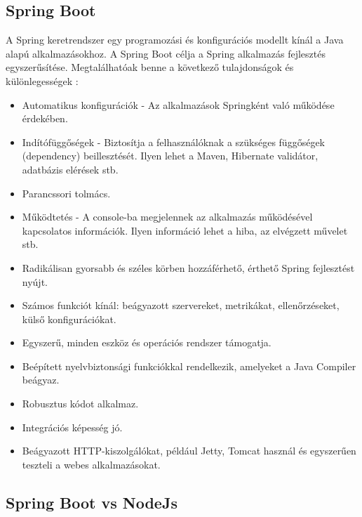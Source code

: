 \subsection{Spring Boot}
A Spring keretrendszer \cite{spring} egy programozási és konfigurációs modellt kínál a Java alapú alkalmazásokhoz. A Spring Boot \cite{jovanovic2017java} célja a Spring alkalmazás fejlesztés egyszerűsítése. Megtalálhatóak benne a következő tulajdonságok és különlegességek \cite{nodejsspring}:
\begin{itemize}
	\item Automatikus konfigurációk - Az alkalmazások Springként való működése érdekében.
	\item Indítófüggőségek - Biztosítja a felhasználóknak a szükséges függőségek (dependency) beillesztését. Ilyen lehet a Maven, Hibernate validátor, adatbázis elérések stb.
	\item Parancssori tolmács.
	\item Működtetés - A console-ba megjelennek az alkalmazás működésével kapcsolatos információk. Ilyen információ lehet a hiba, az elvégzett művelet stb.
	\item Radikálisan gyorsabb és széles körben hozzáférhető, érthető Spring fejlesztést nyújt. 
	\item Számos funkciót kínál: beágyazott szervereket, metrikákat, ellenőrzéseket, külső konfigurációkat.
	\item Egyszerű, minden eszköz és operációs rendszer támogatja.
	\item Beépített nyelvbiztonsági funkciókkal rendelkezik, amelyeket a Java Compiler beágyaz.
	\item Robusztus kódot alkalmaz.
	\item Integrációs képesség jó.
	\item Beágyazott HTTP-kiszolgálókat, például Jetty, Tomcat használ és egyszerűen teszteli a webes alkalmazásokat.
\end{itemize}

\subsection{Spring Boot vs NodeJs}

